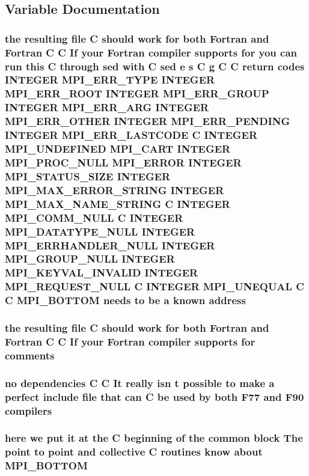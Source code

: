 \subsection{Variable Documentation}
\subsubsection{\setlength{\rightskip}{0pt plus 5cm}the resulting file C should {\bf work} for both Fortran and Fortran C C If your Fortran compiler supports for you can run this C through sed {\bf with} C sed e s C g C C return codes INTEGER MPI\_\-ERR\_\-TYPE INTEGER MPI\_\-ERR\_\-ROOT INTEGER MPI\_\-ERR\_\-GROUP INTEGER MPI\_\-ERR\_\-ARG INTEGER MPI\_\-ERR\_\-OTHER INTEGER MPI\_\-ERR\_\-PENDING INTEGER MPI\_\-ERR\_\-LASTCODE C INTEGER MPI\_\-UNDEFINED MPI\_\-CART INTEGER MPI\_\-PROC\_\-NULL MPI\_\-ERROR INTEGER MPI\_\-STATUS\_\-SIZE INTEGER MPI\_\-MAX\_\-ERROR\_\-STRING INTEGER MPI\_\-MAX\_\-NAME\_\-STRING C INTEGER MPI\_\-COMM\_\-NULL C INTEGER MPI\_\-DATATYPE\_\-NULL INTEGER MPI\_\-ERRHANDLER\_\-NULL INTEGER MPI\_\-GROUP\_\-NULL INTEGER MPI\_\-KEYVAL\_\-INVALID INTEGER MPI\_\-REQUEST\_\-NULL C INTEGER MPI\_\-UNEQUAL C C {\bf MPI\_\-BOTTOM} needs to be a known {\bf address}}\label{mpif_8h_b4cbabdf25ecc88985b013dcd9a9bbf2}


\subsubsection{\setlength{\rightskip}{0pt plus 5cm}the resulting file C should {\bf work} for both Fortran and Fortran C C If your Fortran compiler supports for {\bf comments}}\label{mpif_8h_7f2cf24dc6f52b97e85e4ac8c7e69575}


\subsubsection{ no dependencies C C It really isn t possible to make a perfect include file that can C be used by both F77 and F90 {\bf compilers}}\label{mpif_8h_1f2664a4bb068d0d1bf004fe61262aa3}


\subsubsection{\setlength{\rightskip}{0pt plus 5cm}here we put it at the C beginning of the common block The point to point and collective C routines know about {\bf MPI\_\-BOTTOM}}\label{mpif_8h_af5bfd47ef0ad1f75476f4a1e6eaa8ba}


